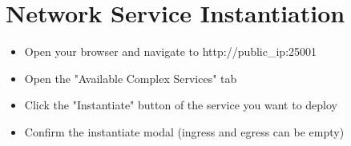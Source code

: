 	\section{Network Service Instantiation}
	\label{sec:Network Service Instantiation}
	\begin{itemize}
		\item Open your browser and navigate to http://public\_ip:25001
		\item Open the "Available Complex Services" tab
		\item Click the "Instantiate" button of the service you want to deploy
		\item Confirm the instantiate modal (ingress and egress can be empty)
		
	\end{itemize}
	



